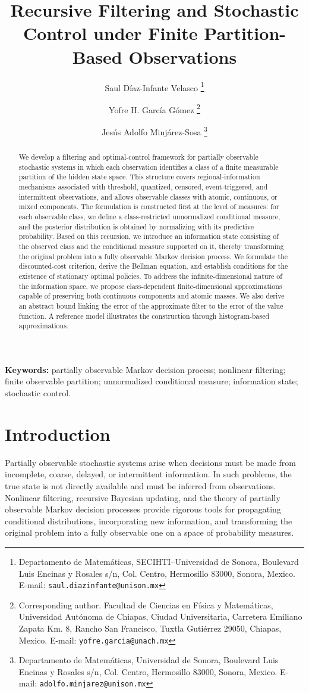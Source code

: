 \documentclass[10pt,twocolumn]{article}
\title{Recursive Filtering and Stochastic Control under Finite Partition-Based Observations}
\author{
	Saul Díaz-Infante Velasco
	\thanks{
		Departamento de Matemáticas,
		SECIHTI--Universidad de Sonora,
		Boulevard Luis Encinas y Rosales s/n,
		Col. Centro,
		Hermosillo 83000,
		Sonora, Mexico.
		E-mail: \texttt{saul.diazinfante@unison.mx}
	}
	\and
	Yofre H. García Gómez
\thanks{
	Corresponding author.
	Facultad de Ciencias en Física y Matemáticas,
	Universidad Autónoma de Chiapas,
	Ciudad Universitaria,
	Carretera Emiliano Zapata Km. 8,
	Rancho San Francisco,
	Tuxtla Gutiérrez 29050,
	Chiapas, Mexico.
	E-mail: \texttt{yofre.garcia@unach.mx}
}
	\and
	Jesús Adolfo Minjárez-Sosa
	\thanks{
		Departamento de Matemáticas,
		Universidad de Sonora,
		Boulevard Luis Encinas y Rosales s/n,
		Col. Centro,
		Hermosillo 83000,
		Sonora, Mexico.
		E-mail: \texttt{adolfo.minjarez@unison.mx}
	}
}
\date{}
\theoremstyle{remark}
\begin{document}
\maketitle

\begin{abstract}
	We develop a filtering and optimal-control framework for partially observable stochastic systems in which each observation identifies a class of a finite measurable partition of the hidden state space. This structure covers regional-information mechanisms associated with threshold, quantized, censored, event-triggered, and intermittent observations, and allows observable classes with atomic, continuous, or mixed components. The formulation is constructed first at the level of measures: for each observable class, we define a class-restricted unnormalized conditional measure, and the posterior distribution is obtained by normalizing with its predictive probability. Based on this recursion, we introduce an information state consisting of the observed class and the conditional measure supported on it, thereby transforming the original problem into a fully observable Markov decision process. We formulate the discounted-cost criterion, derive the Bellman equation, and establish conditions for the existence of stationary optimal policies. To address the infinite-dimensional nature of the information space, we propose class-dependent finite-dimensional approximations capable of preserving both continuous components and atomic masses. We also derive an abstract bound linking the error of the approximate filter to the error of the value function. A reference model illustrates the construction through histogram-based approximations.
\end{abstract}

\noindent\textbf{Keywords:} partially observable Markov decision process; nonlinear filtering; finite observable partition; unnormalized conditional measure; information state; stochastic control.

\section{Introduction}
\label{sec:introduction}


Partially observable stochastic systems arise when decisions must be made from incomplete, coarse, delayed, or intermittent information. In such problems, the true state is not directly available and must be inferred from observations. Nonlinear filtering, recursive Bayesian updating, and the theory of partially observable Markov decision processes provide rigorous tools for propagating conditional distributions, incorporating new information, and transforming the original problem into a fully observable one on a space of probability measures.
\end{document}
